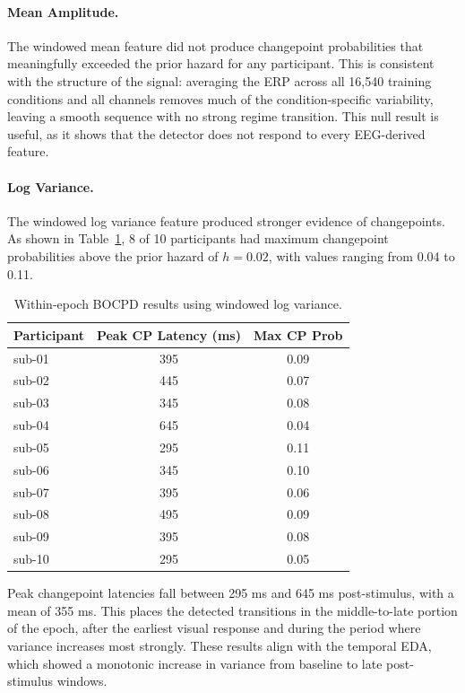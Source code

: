 \documentclass[11pt,letterpaper]{article}
\begin{document}
\paragraph{Mean Amplitude.}
The windowed mean feature did not produce changepoint probabilities that meaningfully exceeded the prior hazard for any participant. This is consistent with the structure of the signal: averaging the ERP across all 16,540 training conditions and all channels removes much of the condition-specific variability, leaving a smooth sequence with no strong regime transition. This null result is useful, as it shows that the detector does not respond to every EEG-derived feature.

\paragraph{Log Variance.}
The windowed log variance feature produced stronger evidence of changepoints. As shown in Table~\ref{tab:within_epoch_variance_results}, 8 of 10 participants had maximum changepoint probabilities above the prior hazard of $h=0.02$, with values ranging from 0.04 to 0.11.

\begin{table}[H]
\centering
\renewcommand{\arraystretch}{.9}
\begin{tabular}{|l|c|c|}
\hline
\textbf{Participant} & \textbf{Peak CP Latency (ms)} & \textbf{Max CP Prob} \\
\hline
sub-01 & 395 & 0.09 \\
\hline
sub-02 & 445 & 0.07 \\
\hline
sub-03 & 345 & 0.08 \\
\hline
sub-04 & 645 & 0.04 \\
\hline
sub-05 & 295 & 0.11 \\
\hline
sub-06 & 345 & 0.10 \\
\hline
sub-07 & 395 & 0.06 \\
\hline
sub-08 & 495 & 0.09 \\
\hline
sub-09 & 395 & 0.08 \\
\hline
sub-10 & 295 & 0.05 \\
\hline
\end{tabular}
\caption{Within-epoch BOCPD results using windowed log variance.}
\label{tab:within_epoch_variance_results}
\end{table}

Peak changepoint latencies fall between 295 ms and 645 ms post-stimulus, with a mean of 355 ms. This places the detected transitions in the middle-to-late portion of the epoch, after the earliest visual response and during the period where variance increases most strongly. These results align with the temporal EDA, which showed a monotonic increase in variance from baseline to late post-stimulus windows.
\end{document}
